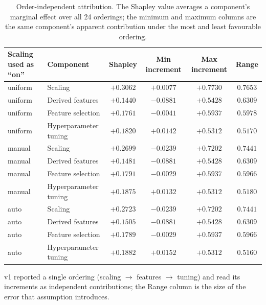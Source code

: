 \begin{table}[htbp]
\centering
\caption{Order-independent attribution. The Shapley value averages a component's marginal effect over all 24 orderings; the minimum and maximum columns are the same component's apparent contribution under the most and least favourable ordering.}\label{tab:ablation-shapley}
\small
\begin{tabular}{llcccc}
\toprule
Scaling used as ``on'' & Component & Shapley & Min increment & Max increment & Range \\
\midrule
uniform & Scaling & $+0.3062$ & $+0.0077$ & $+0.7730$ & $0.7653$ \\
uniform & Derived features & $+0.1440$ & $-0.0881$ & $+0.5428$ & $0.6309$ \\
uniform & Feature selection & $+0.1761$ & $-0.0041$ & $+0.5937$ & $0.5978$ \\
uniform & Hyperparameter tuning & $+0.1820$ & $+0.0142$ & $+0.5312$ & $0.5170$ \\
manual & Scaling & $+0.2699$ & $-0.0239$ & $+0.7202$ & $0.7441$ \\
manual & Derived features & $+0.1481$ & $-0.0881$ & $+0.5428$ & $0.6309$ \\
manual & Feature selection & $+0.1791$ & $-0.0029$ & $+0.5937$ & $0.5966$ \\
manual & Hyperparameter tuning & $+0.1875$ & $+0.0132$ & $+0.5312$ & $0.5180$ \\
auto & Scaling & $+0.2723$ & $-0.0239$ & $+0.7202$ & $0.7441$ \\
auto & Derived features & $+0.1505$ & $-0.0881$ & $+0.5428$ & $0.6309$ \\
auto & Feature selection & $+0.1789$ & $-0.0029$ & $+0.5937$ & $0.5966$ \\
auto & Hyperparameter tuning & $+0.1882$ & $+0.0152$ & $+0.5312$ & $0.5160$ \\
\bottomrule
\end{tabular}
\begin{flushleft}\footnotesize v1 reported a single ordering (scaling $\to$ features $\to$ tuning) and read its increments as independent contributions; the Range column is the size of the error that assumption introduces.\end{flushleft}
\end{table}